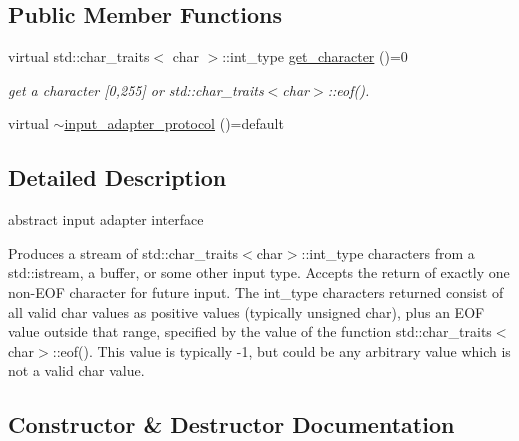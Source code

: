 \subsection*{Public Member Functions}
\begin{DoxyCompactItemize}
\item 
virtual std\+::char\+\_\+traits$<$ char $>$\+::int\+\_\+type \hyperlink{structnlohmann_1_1detail_1_1input__adapter__protocol_aac10a6a4048a8ce8e2ed50277692a3ca}{get\+\_\+character} ()=0
\begin{DoxyCompactList}\small\item\em get a character \mbox{[}0,255\mbox{]} or std\+::char\+\_\+traits$<$char$>$\+::eof(). \end{DoxyCompactList}\item 
virtual \hyperlink{structnlohmann_1_1detail_1_1input__adapter__protocol_a92dac74def4ac5adacd0684088bd4082}{$\sim$input\+\_\+adapter\+\_\+protocol} ()=default
\end{DoxyCompactItemize}


\subsection{Detailed Description}
abstract input adapter interface 

Produces a stream of std\+::char\+\_\+traits$<$char$>$\+::int\+\_\+type characters from a std\+::istream, a buffer, or some other input type. Accepts the return of exactly one non-\/\+E\+OF character for future input. The int\+\_\+type characters returned consist of all valid char values as positive values (typically unsigned char), plus an E\+OF value outside that range, specified by the value of the function std\+::char\+\_\+traits$<$char$>$\+::eof(). This value is typically -\/1, but could be any arbitrary value which is not a valid char value. 

\subsection{Constructor \& Destructor Documentation}
\mbox{\label{structnlohmann_1_1detail_1_1input__adapter__protocol_a92dac74def4ac5adacd0684088bd4082}} 
